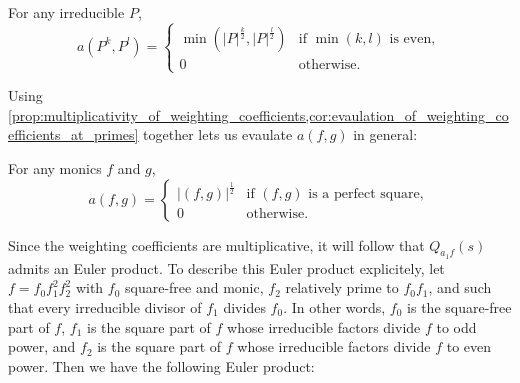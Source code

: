 \documentclass[12pt,reqno,oneside]{amsart}
\begin{document}
    \begin{corollary}\label{cor:evaulation_of_weighting_coefficients_at_primes}
        For any irreducible $P$,
        \[
            a(P^{k},P^{l}) = \begin{cases} \min\left(|P|^{\frac{k}{2}},|P|^{\frac{l}{2}}\right) & \text{if $\min(k,l)$ is even}, \\ 0 & \text{otherwise}. \end{cases}
        \]
    \end{corollary}

    Using \cref{prop:multiplicativity_of_weighting_coefficients,cor:evaulation_of_weighting_coefficients_at_primes} together lets us evaulate $a(f,g)$ in general:

    \begin{corollary}\label{cor:evaulation_of_weighting_coefficients_in_general}
        For any monics $f$ and $g$,
        \[
            a(f,g) = \begin{cases} |(f,g)|^{\frac{1}{2}} & \text{if $(f,g)$ is a perfect square}, \\ 0 & \text{otherwise}. \end{cases}
         \]
    \end{corollary}
    
    Since the weighting coefficients are multiplicative, it will follow that $Q_{a_{1}f}(s)$ admits an Euler product. To describe this Euler product explicitely, let $f = f_{0}f_{1}^{2}f_{2}^{2}$ with $f_{0}$ square-free and monic, $f_{2}$ relatively prime to $f_{0}f_{1}$, and such that every irreducible divisor of $f_{1}$ divides $f_{0}$. In other words, $f_{0}$ is the square-free part of $f$, $f_{1}$ is the square part of $f$ whose irreducible factors divide $f$ to odd power, and $f_{2}$ is the square part of $f$ whose irreducible factors divide $f$ to even power. Then we have the following Euler product:
\end{document}
